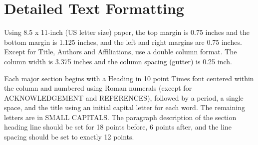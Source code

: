 \documentclass[10pt,conference,letterpaper]{RWWTemplate}
\begin{document}
\section{Detailed Text Formatting}
\label{sec:page style}
Using 8.5 x 11-inch (US letter size) paper, the top margin is 0.75 inches and the bottom margin is 1.125 inches, and the left and right margins are 0.75 inches. Except for Title, Authors and Affiliations, use a double column format. The column width is 3.375 inches and the column spacing (gutter) is 0.25 inch.

Each major section begins with a Heading in 10 point Times font centered within the column and numbered using Roman numerals (except for ACKNOWLEDGEMENT and REFERENCES), followed by a period, a single space, and the title using an initial capital letter for each word. The remaining letters are in SMALL CAPITALS. The paragraph description of the section heading line should be set for 18 points before, 6 points after, and the line spacing should be set to exactly 12 points.
\end{document}
